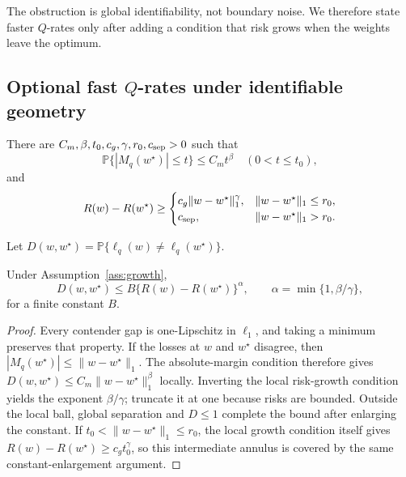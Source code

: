 The obstruction is global identifiability, not boundary noise.  We therefore
state faster \(Q\)-rates only after adding a condition that risk grows when the
weights leave the optimum.

\subsection{Optional fast
\texorpdfstring{\(Q\)}{Q}-rates under identifiable geometry}
\label{sec:theory-fast}

\begin{assumption}
\label{ass:growth}
There are \(C_m,\beta,t_0,c_g,\gamma,r_0,c_{\rm sep}>0\) such that
\begin{equation}
\mathbb P\{|M_q(w^\star)|\le t\}\le C_m t^\beta
\quad(0<t\le t_0),
\label{eq:absolute-margin}
\end{equation}
and
\begin{equation}
R(w)-R(w^\star)\ge
\begin{cases}
c_g\|w-w^\star\|_1^\gamma,
&\|w-w^\star\|_1\le r_0,\\
c_{\rm sep},
&\|w-w^\star\|_1>r_0.
\end{cases}
\label{eq:risk-growth}
\end{equation}
\end{assumption}

Let
\(D(w,w^\star)=\mathbb P\{\ell_q(w)\ne\ell_q(w^\star)\}\).

\begin{proposition}
\label{prop:geom-bernstein}
Under Assumption~\ref{ass:growth},
\begin{equation}
D(w,w^\star)
\le
B\{R(w)-R(w^\star)\}^{\alpha},
\qquad
\alpha=\min\{1,\beta/\gamma\},
\label{eq:bernstein-condition}
\end{equation}
for a finite constant \(B\).
\end{proposition}

\begin{proof}
Every contender gap is one-Lipschitz in \(\ell_1\), and taking a minimum
preserves that property.  If the losses at \(w\) and \(w^\star\) disagree,
then \(|M_q(w^\star)|\le\|w-w^\star\|_1\).  The absolute-margin condition
therefore gives
\(D(w,w^\star)\le C_m\|w-w^\star\|_1^\beta\) locally.  Inverting the local
risk-growth condition yields the exponent \(\beta/\gamma\); truncate it at
one because risks are bounded.  Outside the local ball, global separation and
\(D\le1\) complete the bound after enlarging the constant.  If
\(t_0<\|w-w^\star\|_1\le r_0\), the local growth condition itself gives
\(R(w)-R(w^\star)\ge c_gt_0^\gamma\), so this intermediate annulus is covered
by the same constant-enlargement argument.
\end{proof}

